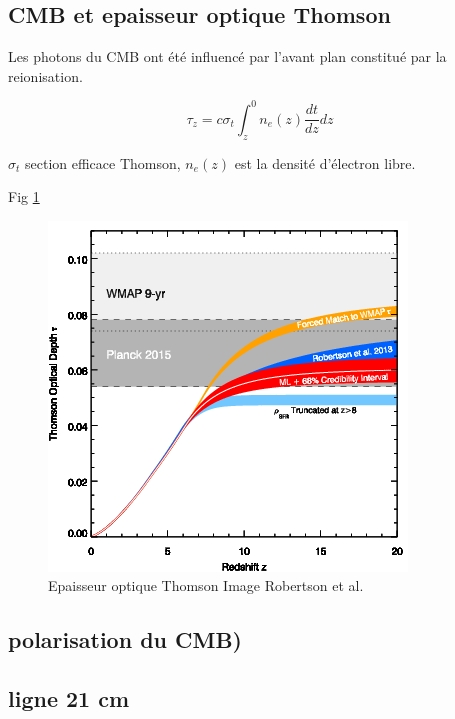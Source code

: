 \subsection{CMB et epaisseur optique Thomson}


Les photons du CMB ont été influencé par l'avant plan constitué par la reionisation.


\begin{equation}
\tau_z = c \sigma_t \int_z^0 n_e (z) \frac{dt}{dz} dz
\end{equation}


$\sigma_t$ section efficace Thomson, $n_e (z)$ est la densité d'électron libre.


Fig \ref{fig:epaisseur_optique_thomson}


\begin{figure}[bth]
        \includegraphics[width=.95\linewidth]{img/01/epaisseur_optique_thomson.png} 
        \caption{%
		Epaisseur optique Thomson
        Image Robertson et al.}
 		\label{fig:epaisseur_optique_thomson}
\end{figure}



\subsection{polarisation du CMB)}

\subsection{ligne 21 cm}

